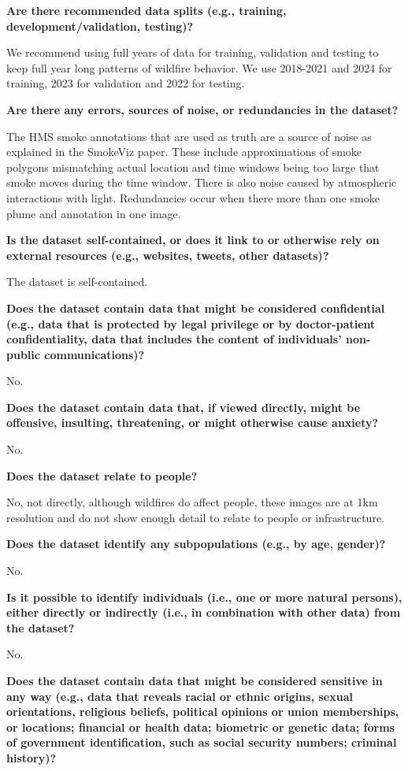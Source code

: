 \documentclass{article}
\begin{document}
\textbf{Are there recommended data splits (e.g., training, development/validation, testing)?}

We recommend using full years of data for training, validation and testing to keep full year long patterns of wildfire behavior. We use 2018-2021 and 2024 for training, 2023 for validation and 2022 for testing.

\textbf{Are there any errors, sources of noise, or redundancies in the dataset?}

The HMS smoke annotations that are used as truth are a source of noise as explained in the SmokeViz paper. These include approximations of smoke polygons mismatching actual location and time windows being too large that smoke moves during the time window. There is also noise caused by atmospheric interactions with light. Redundancies occur when there more than one smoke plume and annotation in one image.

\textbf{Is the dataset self-contained, or does it link to or otherwise rely on external resources (e.g., websites, tweets, other datasets)?}

The dataset is self-contained.

\textbf{Does the dataset contain data that might be considered confidential (e.g., data that is protected by legal privilege or by doctor-patient confidentiality, data that includes the content of individuals’ non-public communications)?}

No.

\textbf{Does the dataset contain data that, if viewed directly, might be offensive, insulting, threatening, or might otherwise cause anxiety?}

No.

\textbf{Does the dataset relate to people? }

No, not directly, although wildfires do affect people, these images are at 1km resolution and do not show enough detail to relate to people or infrastructure.

\textbf{Does the dataset identify any subpopulations (e.g., by age, gender)?}

No.

\textbf{Is it possible to identify individuals (i.e., one or more natural persons), either directly or indirectly (i.e., in combination with other data) from the dataset?}

No.

\textbf{Does the dataset contain data that might be considered sensitive in any way (e.g., data that reveals racial or ethnic origins, sexual orientations, religious beliefs, political opinions or union memberships, or locations; financial or health data; biometric or genetic data; forms of government identification, such as social security numbers; criminal history)?}
\end{document}
